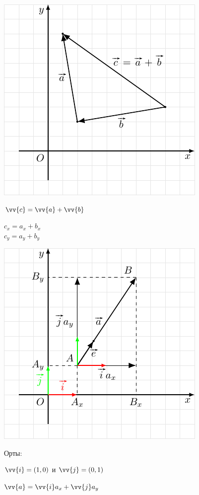 \documentclass[10pt]{beamer}
\begin{document}
    {
    	{
    		
    		\includegraphics{vecsum.pdf}    		
    		
    	}
    	{
    		$\vv{c} = \vv{a} + \vv{b}$
    		
    		\hfill
    		
    		$c_x = a_x + b_x$\\
    		$c_y = a_y + b_y$
    		
    	}
    	
    }
    
    
    {
    	{
    		
    		\includegraphics{veccomponents.pdf}
    		
    		
    	}
    	{
    		Орты:
    		
    		$\vv{i} = (1,0)$ и 	$\vv{j} = (0,1)$
    		
    		\hfill
    		
    		$\vv{a} = \vv{i}a_x+\vv{j}a_y$
    		
    	}
    	
    }
    
\end{document}
